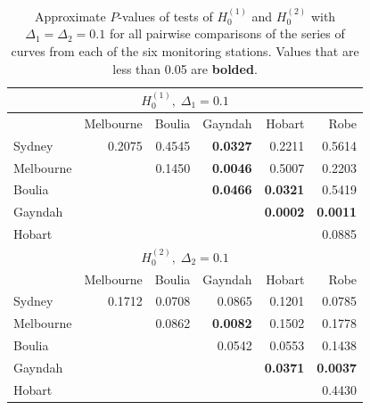 \documentclass[11pt]{article}
\numberwithin{equation}{section}
\numberwithin{theorem}{section}
\numberwithin{lemma}{section}
\numberwithin{proposition}{section}
\numberwithin{cor}{section}
\numberwithin{definition}{section}
\numberwithin{cons}{section}
\numberwithin{rem}{section}
\numberwithin{exa}{section}
\numberwithin{table}{section}
\numberwithin{figure}{section}
\numberwithin{algo}{section}
\begin{document}
{{\begin{table}[!t]
\centering
{\setlength\tabcolsep{5.5pt}%
\begin{tabular}{lrrrrr}
\hline
\multicolumn{6}{c}{$H_0^{(1)}, \; \Delta_1=0.1$}  \\
\hline
& Melbourne & Boulia & Gayndah & Hobart & Robe   \\
Sydney   & 0.2075 & 0.4545 & {\bf 0.0327} &  0.2211 & 0.5614 \\
Melbourne     & & 0.1450 & {\bf 0.0046} &  0.5007 & 0.2203 \\
Boulia  &&&  {\bf 0.0466} & {\bf 0.0321} &0.5419 \\
Gayndah  &&&&  {\bf 0.0002} & {\bf 0.0011} \\
Hobart &&&&& 0.0885 \\
\hline
\multicolumn{6}{c}{$H_0^{(2)}, \; \Delta_2=0.1$}\\
\hline
& Melbourne & Boulia & Gayndah & Hobart & Robe   \\
Sydney  & 0.1712 & 0.0708 &  0.0865 & 0.1201 &  0.0785 \\
Melbourne & &0.0862 &  {\bf 0.0082} & 0.1502 &  0.1778 \\
Boulia & & &  0.0542 & 0.0553 & 0.1438 \\
Gayndah & & & & {\bf 0.0371} &  {\bf 0.0037} \\
Hobart & & & & & 0.4430 \\
\hline
\end{tabular}}
\caption{Approximate $P$-values of tests of $H_0^{(1)}$ and $H_0^{(2)}$ with $\Delta_1=\Delta_2=0.1$ for all pairwise comparisons of the series of curves from each of the six monitoring stations. Values that are less than 0.05 are {\bf bolded}. }\label{h1:tab}
\label{tab1}

\end{table}

}}
\end{document}
